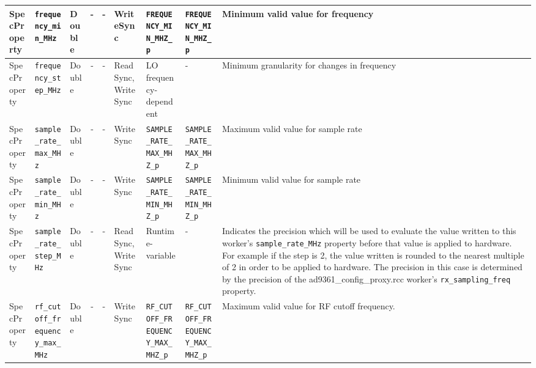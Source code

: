 \begin{landscape}
\begin{scriptsize}
\begin{longtable}{|p{1.8cm}|p{4.1cm}|p{1cm}|c|c|p{1.6cm}|p{3.7cm}|p{3.7cm}|p{2.5cm}|}
			\hline
			SpecProperty & \verb+frequency_min_MHz+            & Double& -        & -          & WriteSync      & \verb+FREQUENCY_MIN_MHZ_p+ & \verb+FREQUENCY_MIN_MHZ_p+ & Minimum valid value for frequency                                                                                                                                                                                           \\
			\hline
			SpecProperty & \verb+frequency_step_MHz+           & Double& -        & -          & ReadSync, WriteSync & LO frequency-dependent & - & Minimum granularity for changes in frequency                                                                                                                                                                                \\
			\hline
			SpecProperty & \verb+sample_rate_max_MHz+          & Double& -        & -          & WriteSync & \verb+SAMPLE_RATE_MAX_MHZ_p+ & \verb+SAMPLE_RATE_MAX_MHZ_p+ & Maximum valid value for sample rate                                                                                                                                                                                         \\
			\hline
			SpecProperty & \verb+sample_rate_min_MHz+          & Double& -        & -          & WriteSync & \verb+SAMPLE_RATE_MIN_MHZ_p+ & \verb+SAMPLE_RATE_MIN_MHZ_p+ & Minimum valid value for sample rate                                                                                                                                                                                         \\
			\hline
			SpecProperty & \verb+sample_rate_step_MHz+         & Double& -        & -          & ReadSync, WriteSync & Runtime-variable & - & Indicates the precision which will be used to evaluate the value written
        to this worker's \verb+sample_rate_MHz+ property
        before that value is applied to hardware. For example if the step is 2,
        the value written is rounded to the nearest multiple of 2 in order to
        be applied to hardware. The precision in this case is determined by the
        precision of the ad9361\_config\_proxy.rcc worker's
        \verb+rx_sampling_freq+ property.                                                                                                                                                                              \\
			\hline
			SpecProperty & \verb+rf_cutoff_frequency_max_MHz+  & Double& -        & -          & WriteSync      & \verb+RF_CUTOFF_FREQUENCY_MAX_MHZ_p+ & \verb+RF_CUTOFF_FREQUENCY_MAX_MHZ_p+ & Maximum valid value for RF cutoff frequency. \\

\end{longtable}
\end{scriptsize}
\end{landscape}
